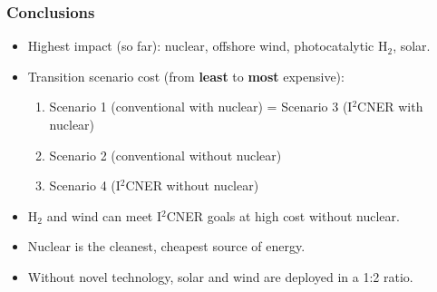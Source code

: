 \begin{frame}
  \frametitle{Conclusions}
        \begin{itemize}
        
        \item Highest impact (so far): nuclear, offshore wind, photocatalytic H$_2$, solar.
        
        \item Transition scenario cost (from \textbf{least} to \textbf{most} expensive):\\
        
        \begin{enumerate} 
        
        \item Scenario 1 (conventional with nuclear) = Scenario 3 (I$^2$CNER with nuclear)
        
        \item Scenario 2 (conventional without nuclear)
        
        \item Scenario 4 (I$^2$CNER without nuclear)
        
        \end{enumerate}        
        
         
        
        \item H$_2$ and wind can meet I$^2$CNER goals at high cost without nuclear.

        \item Nuclear is the cleanest, cheapest source of energy.
        
        \item Without novel technology, solar and wind are deployed in a 1:2 ratio.
                
        \end{itemize}
\end{frame}

